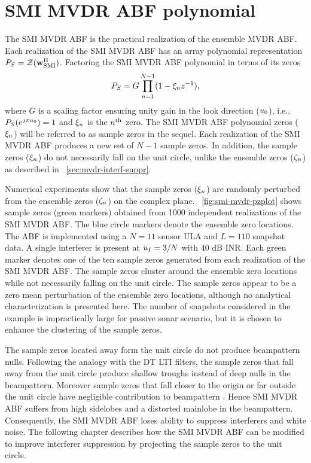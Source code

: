 \section{SMI MVDR ABF polynomial}
\label{sec:smi-poly}
The SMI MVDR ABF is the practical realization of the ensemble MVDR
ABF. Each realization of the SMI MVDR ABF has an array polynomial
representation $P_S = \mathcal{Z}({\bf w}_{\rm SMI}^{\rm H})$. Factoring the SMI
MVDR ABF polynomial in terms of its zeros
\[
P_S = G\prod\limits_{n = 1}^{N-1}(1 - \xi_nz^{-1}),
\]
where $G$ is a scaling factor ensuring unity gain in the look
direction ($u_0$), i.e., $P_S(e^{j\pi u_0}) = 1$ and
$\xi_n$ is the $n^{\rm th}$ zero. The SMI MVDR ABF polynomial zeros
($\xi_n$) will be referred to as sample zeros in the sequel. Each
realization of the SMI MVDR ABF produces a new set of $N-1$ sample
zeros. In addition, the sample zeros ($\xi_n$) do not necessarily
fall on the unit circle, unlike the ensemble zeros ($\zeta_n$) as
described in \sect{}~\ref{sec:mvdr-interf-suppr}.

Numerical experiments show that the sample zeros ($\xi_n$) are
randomly perturbed from the ensemble zeros ($\zeta_n$) on the complex
plane. \figurename{}~\ref{fig:smi-mvdr-pzplot} shows sample zeros
(green markers) obtained from 1000 independent realizations of the SMI
MVDR ABF. The blue circle markers denote the ensemble zero
locations. The ABF is implemented using a $N = 11$ sensor ULA and
$L = 110$ snapshot data. A single interferer is present at
$u_I = 3/N$ with $40$ dB INR. Each green marker denotes one of the
ten sample zeros generated from each realization of the SMI MVDR
ABF. The sample zeros cluster around the ensemble zero locations while
not necessarily falling on the unit circle. The sample zeros appear to
be a zero mean perturbation of the ensemble zero locations, although
no analytical characterization is presented here. The number of
snapshots considered in the example is impractically large for passive
sonar scenario, but it is chosen to enhance the clustering of the
sample zeros.%

The sample zeros located away form the unit circle do not produce
beampattern nulls. Following the analogy with the DT LTI filters, the
sample zeros that fall away from the unit circle produce shallow
troughs instead of deep nulls in the beampattern. Moreover sample
zeros that fall closer to the origin or far outside the unit circle
have negligible contribution to beampattern
\cite[Chap.~5]{Oppenheim1989}. Hence SMI MVDR ABF suffers from high
sidelobes and a distorted mainlobe in the beampattern. Consequently,
the SMI MVDR ABF loses ability to suppress interferers and white
noise. The following chapter describes how the SMI MVDR ABF can be
modified to improve interferer suppression by projecting the sample
zeros to the unit circle.

